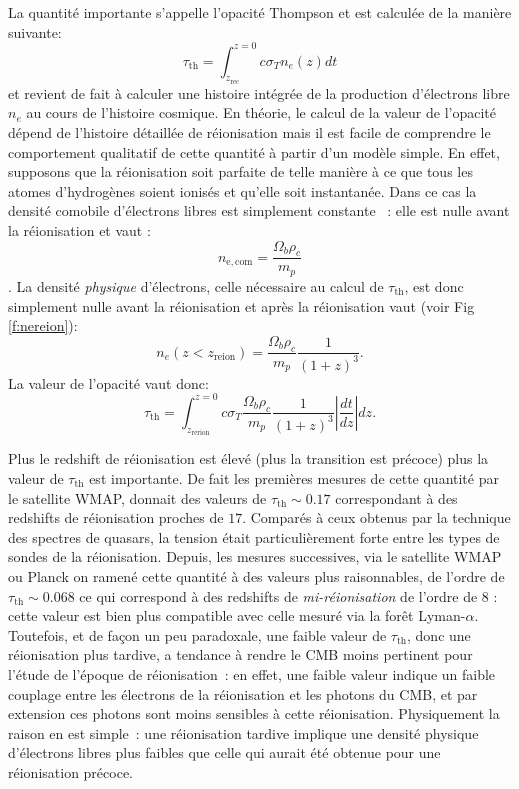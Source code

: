 La quantité importante s'appelle l'opacité Thompson et est calculée de la manière suivante:
\begin{equation}
\tau_\mathrm{th}=\int_{z_\mathrm{rec}}^{z=0} c \sigma_T n_e(z) dt
\end{equation}
et revient de fait à calculer une histoire intégrée de la production d'électrons libre $n_e$ au cours de l'histoire cosmique. En théorie, le calcul de la valeur de l'opacité dépend de l'histoire détaillée de réionisation mais il est facile de comprendre le comportement qualitatif de cette quantité à partir d'un modèle simple. En effet, supposons que la réionisation soit parfaite de telle manière à ce que tous les atomes d'hydrogènes soient ionisés et qu'elle soit instantanée. Dans ce cas la densité comobile d'électrons libres est simplement constante ~: elle est nulle avant la réionisation et vaut :
\begin{equation}
n_\mathrm{e,com}=\frac{\Omega_b \rho_c}{m_p}
\end{equation}.
La densité \textit{physique} d'électrons, celle nécessaire au calcul de $\tau_\mathrm{th}$, est donc simplement nulle avant la réionisation et après la réionisation vaut (voir Fig \ref{f:nereion}):
\begin{equation}
n_e(z<z_\mathrm{reion})=\frac{\Omega_b \rho_c}{m_p} \frac{1}{(1+z)^3}.
\end{equation}
La valeur de l'opacité vaut donc:
\begin{equation}
\tau_\mathrm{th}=\int_{z_\mathrm{rerion}}^{z=0} c \sigma_T\frac{\Omega_b \rho_c}{m_p} \frac{1}{(1+z)^3}  |\frac{dt}{dz}| dz.
\end{equation}

Plus le redshift de réionisation est élevé (plus la transition est précoce) plus la valeur de $\tau_\mathrm{th}$ est importante. De fait les premières mesures de cette quantité par le satellite WMAP, donnait des valeurs de $\tau_\mathrm{th}\sim 0.17$ correspondant à des redshifts de réionisation proches de $17$. Comparés à ceux obtenus par la technique des spectres de quasars, la tension était particulièrement forte entre les types de sondes de la réionisation. Depuis, les mesures successives, via le satellite WMAP ou Planck on ramené cette quantité à des valeurs plus raisonnables, de l'ordre de $\tau_\mathrm{th}\sim 0.068$ ce qui correspond à des redshifts de \textit{mi-réionisation} de l'ordre de 8 : cette valeur est bien plus compatible avec celle mesuré via la forêt Lyman-$\alpha$. Toutefois, et de façon un peu paradoxale, une faible valeur de $\tau_\mathrm{th}$, donc une réionisation plus tardive, a tendance à rendre le CMB moins pertinent pour l'étude de l'époque de réionisation~: en effet, une faible valeur indique un faible couplage entre les électrons de la réionisation et les photons du CMB, et par extension ces photons sont moins sensibles à cette réionisation. Physiquement la raison en est simple~: une réionisation tardive implique une densité physique d'électrons libres plus faibles que celle qui aurait été obtenue pour une réionisation précoce.

